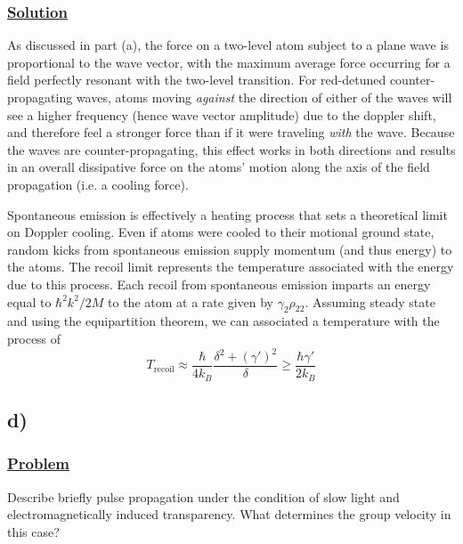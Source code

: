 \documentclass[12pt]{article}
\begin{document}
\subsubsection*{\underline{Solution}}
As discussed in part (a), the force on a two-level atom subject to a plane wave is proportional to the wave vector, with the maximum average force occurring for a field perfectly resonant with the two-level transition.
For red-detuned counter-propagating waves, atoms moving \textit{against} the direction of either of the waves will see a higher frequency (hence wave vector amplitude) due to the doppler shift, and therefore feel a stronger force than if it were traveling \textit{with} the wave.
Because the waves are counter-propagating, this effect works in both directions and results in an overall dissipative force on the atoms' motion along the axis of the field propagation (i.e. a cooling force).

Spontaneous emission is effectively a heating process that sets a theoretical limit on Doppler cooling.
Even if atoms were cooled to their motional ground state, random kicks from spontaneous emission supply momentum (and thus energy) to the atoms.
The recoil limit represents the temperature associated with the energy due to this process.
Each recoil from spontaneous emission imparts an energy equal to $\hbar^2k^2/2M$ to the atom at a rate given by $\gamma_2\rho_{22}$.
Assuming steady state and using the equipartition theorem, we can associated a temperature with the process of 
\[ T_\text{recoil} \approx \frac{\hbar}{4k_B}\frac{\delta^2 + (\gamma')^2}{\delta} \geq \frac{\hbar\gamma'}{2k_B} \]


\subsection*{d)}
\subsubsection*{\underline{Problem}}
Describe briefly pulse propagation under the condition of slow light and electromagnetically induced transparency.
What determines the group velocity in this case?
\end{document}

